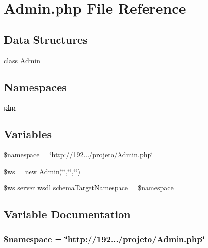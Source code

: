 \hypertarget{_admin_8php}{}\section{Admin.\+php File Reference}
\label{_admin_8php}
\subsection*{Data Structures}
\begin{DoxyCompactItemize}
\item 
class \hyperlink{class_admin}{Admin}
\end{DoxyCompactItemize}
\subsection*{Namespaces}
\begin{DoxyCompactItemize}
\item 
 \hyperlink{namespacephp}{php}
\end{DoxyCompactItemize}
\subsection*{Variables}
\begin{DoxyCompactItemize}
\item 
\hyperlink{_admin_8php_a3825c9b9060c2d6ef594385997cd60aa}{\$namespace} = \char`\"{}http\+://192.../projeto/Admin.\+php\char`\"{}
\item 
\hyperlink{_admin_8php_a311685f250a0c7dbb10444068b95db6d}{\$ws} = new \hyperlink{class_admin}{Admin}(\char`\"{}\char`\"{},\char`\"{}\char`\"{},\char`\"{}\char`\"{})
\item 
\$ws server \hyperlink{classwsdl}{wsdl} \hyperlink{_admin_8php_ab197a5bef9bb7041545b3f0b6db00f8f}{schema\+Target\+Namespace} = \$namespace
\end{DoxyCompactItemize}


\subsection{Variable Documentation}
\hypertarget{_admin_8php_a3825c9b9060c2d6ef594385997cd60aa}{}
\subsubsection[{\$namespace}]{\setlength{\rightskip}{0pt plus 5cm}\$namespace = \char`\"{}http\+://192.../projeto/Admin.\+php\char`\"{}}\label{_admin_8php_a3825c9b9060c2d6ef594385997cd60aa}
\hypertarget{_admin_8php_a311685f250a0c7dbb10444068b95db6d}{}
